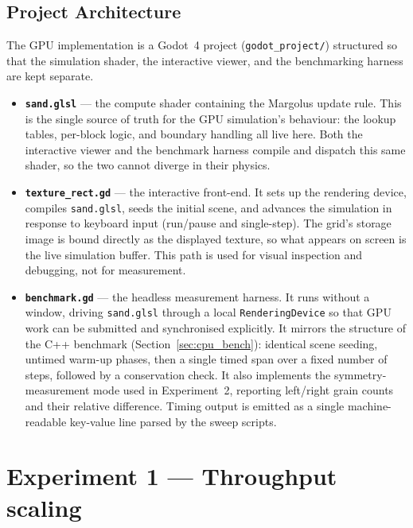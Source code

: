 \documentclass[oneside, a4paper, onecolumn, 11pt]{article}
\begin{document}
\subsection{Project Architecture}

The GPU implementation is a Godot~4 project (\texttt{godot\_project/}) structured so that the simulation shader, the interactive viewer, and the benchmarking harness are kept separate.

\begin{itemize}
    \item \textbf{\texttt{sand.glsl}} --- the compute shader containing the Margolus update rule.
    This is the single source of truth for the GPU simulation's behaviour: the lookup tables, per-block logic, and boundary handling all live here.
    Both the interactive viewer and the benchmark harness compile and dispatch this same shader, so the two cannot diverge in their physics.

    \item \textbf{\texttt{texture\_rect.gd}} --- the interactive front-end.
    It sets up the rendering device, compiles \texttt{sand.glsl}, seeds the initial scene, and advances the simulation in response to keyboard input (run/pause and single-step).
    The grid's storage image is bound directly as the displayed texture, so what appears on screen is the live simulation buffer.
    This path is used for visual inspection and debugging, not for measurement.

    \item \textbf{\texttt{benchmark.gd}} --- the headless measurement harness.
    It runs without a window, driving \texttt{sand.glsl} through a local \texttt{RenderingDevice} so that GPU work can be submitted and synchronised explicitly.
    It mirrors the structure of the C++ benchmark (Section~\ref{sec:cpu_bench}): identical scene seeding, untimed warm-up phases, then a single timed span over a fixed number of steps, followed by a conservation check.
    It also implements the symmetry-measurement mode used in Experiment~2, reporting left/right grain counts and their relative difference.
    Timing output is emitted as a single machine-readable key-value line parsed by the sweep scripts.
\end{itemize}


\section{Experiment 1 --- Throughput scaling}
\label{sec:exp1}
\end{document}
